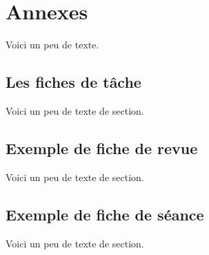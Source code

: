     \chapter{Annexes}
    Voici un peu de texte.
    \section{Les fiches de tâche}
    Voici un peu de texte de section.
    \section{Exemple de fiche de revue}
    Voici un peu de texte de section.
    \section{Exemple de fiche de séance}
    Voici un peu de texte de section.



